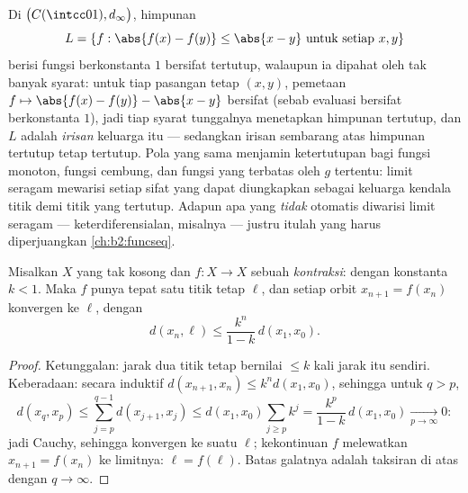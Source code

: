 \begin{example}\label{ex:b2:metric:lipclosed}
Di $\bigl(C(\intcc01), d_\infty\bigr)$, himpunan
\[
L = \{f : \abs{f(x) - f(y)} \leq \abs{x - y}
\ \text{untuk setiap } x, y\}
\]
berisi fungsi  berkonstanta $1$ bersifat tertutup, walaupun ia
dipahat oleh tak  banyak syarat: untuk tiap pasangan tetap $(x,
y)$, pemetaan $f \mapsto \abs{f(x) - f(y)} - \abs{x - y}$ bersifat
 (sebab evaluasi bersifat  berkonstanta $1$), jadi tiap
syarat tunggalnya menetapkan himpunan tertutup, dan $L$ adalah
\emph{irisan} keluarga itu --- sedangkan irisan sembarang atas himpunan
tertutup tetap tertutup. Pola yang sama menjamin ketertutupan bagi fungsi
monoton, fungsi cembung, dan fungsi yang terbatas oleh $g$ tertentu:
limit seragam mewarisi setiap sifat yang dapat diungkapkan sebagai
keluarga kendala titik demi titik yang tertutup. Adapun apa yang
\emph{tidak} otomatis diwarisi limit seragam --- keterdiferensialan,
misalnya --- justru itulah yang harus diperjuangkan \cref{ch:b2:funcseq}.
\end{example}

\begin{theorem}\label{thm:b2:metric:banach}
Misalkan $X$  yang tak kosong dan $f \colon X \to X$
sebuah \emph{kontraksi}:  dengan konstanta $k < 1$. Maka $f$
punya tepat satu titik tetap $\ell$, dan setiap orbit $x_{n+1} = f(x_n)$
konvergen ke $\ell$, dengan
\[
d(x_n, \ell) \leq \frac{k^n}{1 - k}\, d(x_1, x_0) .
\]
\end{theorem}

\begin{proof}
Ketunggalan: jarak dua titik tetap bernilai $\leq k$ kali jarak itu
sendiri. Keberadaan: secara induktif $d(x_{n+1}, x_n) \leq k^n d(x_1,
x_0)$, sehingga untuk $q > p$,
\[
d(x_q, x_p) \leq \sum_{j=p}^{q-1} d(x_{j+1}, x_j)
\leq d(x_1, x_0) \sum_{j \geq p} k^j
= \frac{k^p}{1-k}\, d(x_1, x_0) \xrightarrow[p\to\infty]{} 0 :
\]
jadi Cauchy, sehingga konvergen ke suatu $\ell$; kekontinuan $f$
melewatkan $x_{n+1} = f(x_n)$ ke limitnya: $\ell = f(\ell)$. Batas
galatnya adalah taksiran di atas dengan $q \to \infty$.
\end{proof}

